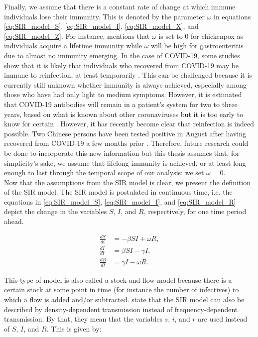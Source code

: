 \documentclass[12pt]{article}
\begin{document}
	Finally, we assume that there is a constant rate of change at which immune individuals lose their immunity. This is denoted by the parameter $\omega$ in equations \eqref{eq:SIR_model_S}, \eqref{eq:SIR_model_I}, \eqref{eq:SIR_model_X}, and \eqref{eq:SIR_model_Z}.  For instance, \textcite{adda2016economic} mentions that $\omega$ is set to 0 for chickenpox as individuals acquire a lifetime immunity while $\omega$ will be high for gastroenteritis due to almost no immunity emerging. In the case of COVID-19, some studies show that it is likely that individuals who recovered from COVID-19 may be immune to reinfection, at least temporarily \parencite{kirkcaldy2020covid}. This can be challenged because it is currently still unknown whether immunity is always achieved, especially among those who have had only light to medium symptoms. However, it is estimated that COVID-19 antibodies will remain in a patient’s system for two to three years, based on what is known about other coronaviruses but it is too early to know for certain \parencite{leung_2020}. However, it has recently become clear that reinfection is indeed possible. Two Chinese persons have been tested positive in August after having recovered from COVID-19 a few months prior \parencite{bloomberg2020reinfection}. Therefore, future research could be done to incorporate this new information but this thesis assumes that, for simplicity's sake, we assume that lifelong immunity is achieved, or at least long enough to last through the temporal scope of our analysis: we set $\omega = 0$. \\
	
	Now that the assumptions from the SIR model is clear, we present the definition of the SIR model. The SIR model is postulated in continuous time, i.e. the equations in \eqref{eq:SIR_model_S}, \eqref{eq:SIR_model_I}, and \eqref{eq:SIR_model_R} depict the change in the variables $S$, $I$, and $R$, respectively, for one time period ahead.
	
	\begin{align}
    	\frac{dS}{dt} &= -\beta SI + \omega R, \label{eq:SIR_model_S}\\
    	\frac{dI}{dt} &= \beta SI - \gamma I, \label{eq:SIR_model_I}\\
    	\frac{dR}{dt} &= \gamma I - \omega R. \label{eq:SIR_model_R}
	\end{align}
	
	This type of model is also called a stock-and-flow model because there is a certain stock at some point in time (for instance the number of infectives) to which a flow is added and/or subtracted. \textcite{keeling2011modeling} state that the SIR model can also be described by density-dependent transmission instead of frequency-dependent transmission. By that, they mean that the variables $s$, $i$, and $r$ are used instead of $S$, $I$, and $R$. This is given by:
	
\end{document}

